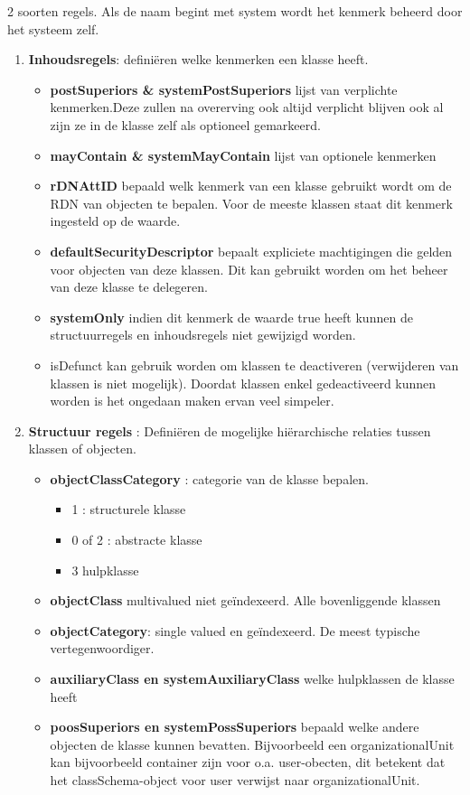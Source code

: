 2 soorten regels. Als de naam begint met system wordt het kenmerk beheerd door het systeem zelf.
\begin{enumerate}
\item \textbf{Inhoudsregels}: defini\"eren welke kenmerken een klasse heeft.
\begin{itemize}
\item \textbf{postSuperiors \& systemPostSuperiors} lijst van verplichte kenmerken.Deze zullen na overerving ook altijd verplicht blijven ook al zijn ze in de klasse zelf als optioneel gemarkeerd.
\item \textbf{mayContain \& systemMayContain} lijst van optionele kenmerken
\item \textbf{rDNAttID} bepaald welk kenmerk van een klasse gebruikt wordt om de RDN van objecten te bepalen. Voor de meeste klassen staat dit kenmerk ingesteld op de waarde.
\item \textbf{defaultSecurityDescriptor} bepaalt expliciete machtigingen die gelden voor objecten van deze klassen. Dit kan gebruikt worden om het beheer van deze klasse te delegeren.
\item \textbf{systemOnly} indien dit kenmerk de waarde true heeft kunnen de structuurregels en inhoudsregels niet gewijzigd worden.
\item isDefunct kan gebruik worden om klassen te deactiveren (verwijderen van klassen is niet mogelijk). Doordat klassen enkel gedeactiveerd kunnen worden is het ongedaan maken ervan veel simpeler.
\end{itemize}
\clearpage
\item \textbf{Structuur regels} : Defini\"eren de mogelijke hi\"erarchische relaties tussen klassen of objecten.
\begin{itemize}
\item \textbf{objectClassCategory} : categorie van de klasse bepalen. 
\begin{itemize}
\item 1 : structurele klasse
\item 0 of 2 : abstracte klasse
\item 3 hulpklasse
\end{itemize}
\item \textbf{objectClass} multivalued niet ge\"indexeerd. Alle bovenliggende klassen
\item \textbf{objectCategory}: single valued en ge\"indexeerd. De meest typische vertegenwoordiger.
\item \textbf{auxiliaryClass en systemAuxiliaryClass}  welke hulpklassen de klasse heeft
\item \textbf{poosSuperiors en systemPossSuperiors} bepaald welke andere objecten de klasse kunnen bevatten. Bijvoorbeeld een organizationalUnit kan bijvoorbeeld container zijn voor o.a. user-obecten, dit betekent dat het classSchema-object voor user verwijst naar organizationalUnit.
\end{itemize}
\end{enumerate}

